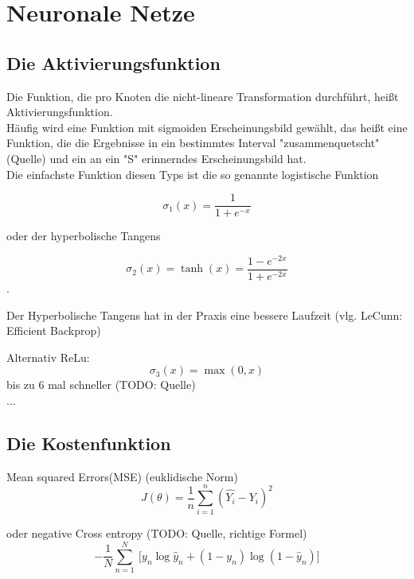 \section{Neuronale Netze} %

\subsection{Die Aktivierungsfunktion}
Die Funktion, die pro Knoten die nicht-lineare Transformation durchführt, heißt Aktivierungsfunktion. \\
Häufig wird eine Funktion mit sigmoiden Erscheinungsbild gewählt, das heißt eine Funktion, die die Ergebnisse in ein bestimmtes Interval "zusammenquetscht" (Quelle) und ein an ein "S" erinnerndes Erscheinungsbild hat. 
\\
Die einfachste Funktion diesen Typs ist die so genannte logistische Funktion

\begin{equation}
\sigma_1(x) = \frac{1}{1+e^{-x}}
\end{equation}

oder der hyperbolische Tangens

\begin{equation}
\sigma_2(x) = \tanh(x) = \frac{1-e^{-2x}}{1+e^{-2x}}
\end{equation}.

Der Hyperbolische Tangens hat in der Praxis eine bessere Laufzeit (vlg. LeCunn: Efficient Backprop)

Alternativ ReLu:
\begin{equation}
\sigma_3(x) = \max(0,x)
\end{equation} bis zu 6 mal schneller (TODO: Quelle) \\
...

\subsection{Die Kostenfunktion}
Mean squared Errors(MSE) (euklidische Norm)
\begin{equation}
J(\theta) = \frac{1}{n} \sum_{i=1}^n \left (\hat{Y_i} - Y_i \right)^2
\end{equation}

oder negative Cross entropy (TODO: Quelle, richtige Formel)
\begin{equation}
    -\frac1N\sum_{n=1}^N\ \bigg[y_n  \log \hat y_n + (1 - y_n)  \log (1 - \hat y_n)\bigg]
\end{equation}

